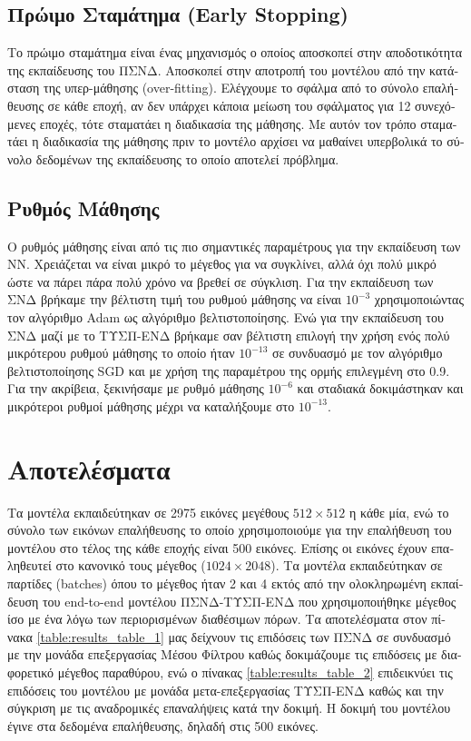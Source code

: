 \subsection{\textgreek{Πρώιμο Σταμάτημα} (Early Stopping)}
\textgreek{Το πρώιμο σταμάτημα είναι ένας μηχανισμός ο οποίος αποσκοπεί στην αποδοτικότητα της εκπαίδευσης του ΠΣΝΔ. Αποσκοπεί στην αποτροπή του μοντέλου από την κατάσταση της υπερ-μάθησης }(over-fitting). \textgreek{Ελέγχουμε το σφάλμα από το σύνολο επαλήθευσης σε κάθε εποχή, αν δεν υπάρχει κάποια μείωση του σφάλματος για 12 συνεχόμενες εποχές, τότε σταματάει η διαδικασία της μάθησης. Με αυτόν τον τρόπο σταματάει η διαδικασία της μάθησης πριν το μοντέλο αρχίσει να μαθαίνει υπερβολικά το σύνολο δεδομένων της εκπαίδευσης το οποίο αποτελεί πρόβλημα.}

\subsection{\textgreek{Ρυθμός Μάθησης}}
\textgreek{Ο ρυθμός μάθησης είναι από τις πιο σημαντικές παραμέτρους για την εκπαίδευση των ΝΝ. Χρειάζεται να είναι μικρό το μέγεθος για να συγκλίνει, αλλά όχι πολύ μικρό ώστε να πάρει πάρα πολύ χρόνο να βρεθεί σε σύγκλιση. Για την εκπαίδευση των ΣΝΔ βρήκαμε την βέλτιστη τιμή του ρυθμού μάθησης να είναι $10^{-3}$ χρησιμοποιώντας τον αλγόριθμο} Adam \textgreek{ ως αλγόριθμο βελτιστοποίησης. Ενώ για την εκπαίδευση του ΣΝΔ μαζί με το ΤΥΣΠ-ΕΝΔ βρήκαμε σαν βέλτιστη επιλογή την χρήση ενός πολύ μικρότερου ρυθμού μάθησης το οποίο ήταν $10^{-13}$ σε συνδυασμό με τον αλγόριθμο βελτιστοποίησης} SGD \textgreek{και με χρήση της παραμέτρου της ορμής επιλεγμένη στο 0.9. Για την ακρίβεια, ξεκινήσαμε με ρυθμό μάθησης $10^{-6}$ και σταδιακά δοκιμάστηκαν και μικρότεροι ρυθμοί μάθησης μέχρι να καταλήξουμε στο $10^{-13}$. }



\section{\textgreek{Αποτελέσματα}}
\textgreek{Τα μοντέλα εκπαιδεύτηκαν σε 2975 εικόνες μεγέθους $512\times 512$ η κάθε μία, ενώ το σύνολο των εικόνων επαλήθευσης το οποίο χρησιμοποιούμε για την επαλήθευση του μοντέλου στο τέλος της κάθε εποχής είναι 500 εικόνες. Επίσης οι εικόνες έχουν επαληθευτεί στο κανονικό τους μέγεθος ($1024\times 2048$). Τα μοντέλα εκπαιδεύτηκαν σε παρτίδες }(batches) \textgreek{όπου το μέγεθος ήταν 2 και 4 εκτός από την ολοκληρωμένη εκπαίδευση του }end-to-end \textgreek{μοντέλου ΠΣΝΔ-ΤΥΣΠ-ΕΝΔ που χρησιμοποιήθηκε μέγεθος ίσο με ένα λόγω των περιορισμένων διαθέσιμων πόρων. Τα αποτελέσματα στον πίνακα }\ref{table:results_table_1} \textgreek{μας δείχνουν τις επιδόσεις των ΠΣΝΔ σε συνδυασμό με την μονάδα επεξεργασίας Μέσου Φίλτρου καθώς δοκιμάζουμε τις επιδόσεις με διαφορετικό μέγεθος παραθύρου, ενώ ο πίνακας }\ref{table:results_table_2} \textgreek{επιδεικνύει τις επιδόσεις του μοντέλου με μονάδα μετα-επεξεργασίας ΤΥΣΠ-ΕΝΔ καθώς και την σύγκριση με τις αναδρομικές επαναλήψεις κατά την δοκιμή. Η δοκιμή του μοντέλου έγινε στα δεδομένα επαλήθευσης, δηλαδή στις 500 εικόνες.} 


